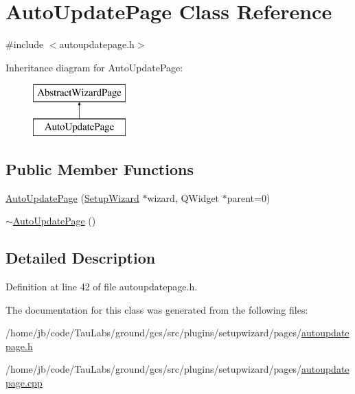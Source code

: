 \hypertarget{class_auto_update_page}{\section{\-Auto\-Update\-Page \-Class \-Reference}
\label{class_auto_update_page}
}


{\ttfamily \#include $<$autoupdatepage.\-h$>$}

\-Inheritance diagram for \-Auto\-Update\-Page\-:\begin{figure}[H]
\begin{center}
\leavevmode
\includegraphics[height=2.000000cm]{class_auto_update_page}
\end{center}
\end{figure}
\subsection*{\-Public \-Member \-Functions}
\begin{DoxyCompactItemize}
\item 
\hyperlink{group___auto_update_page_gad36dc27e90157da88544e92b50f100f7}{\-Auto\-Update\-Page} (\hyperlink{class_setup_wizard}{\-Setup\-Wizard} $\ast$wizard, \-Q\-Widget $\ast$parent=0)
\item 
\hyperlink{group___auto_update_page_gae63f6d82a40a332f3f38aec3515b2296}{$\sim$\-Auto\-Update\-Page} ()
\end{DoxyCompactItemize}


\subsection{\-Detailed \-Description}


\-Definition at line 42 of file autoupdatepage.\-h.



\-The documentation for this class was generated from the following files\-:\begin{DoxyCompactItemize}
\item 
/home/jb/code/\-Tau\-Labs/ground/gcs/src/plugins/setupwizard/pages/\hyperlink{autoupdatepage_8h}{autoupdatepage.\-h}\item 
/home/jb/code/\-Tau\-Labs/ground/gcs/src/plugins/setupwizard/pages/\hyperlink{autoupdatepage_8cpp}{autoupdatepage.\-cpp}\end{DoxyCompactItemize}

